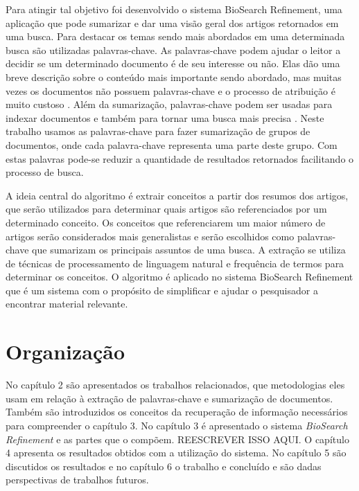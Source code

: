 Para atingir tal objetivo foi desenvolvido o sistema BioSearch Refinement, uma aplicação que pode sumarizar e dar uma visão geral dos artigos retornados em uma busca. Para destacar os temas sendo mais abordados em uma determinada busca são utilizadas palavras-chave. As palavras-chave podem ajudar o leitor a decidir se um determinado documento é de seu interesse ou não. Elas dão uma breve descrição sobre o conteúdo mais importante sendo abordado, mas muitas vezes os documentos não possuem palavras-chave e o processo de atribuição é muito custoso \cite{Lui2007}. Além da sumarização, palavras-chave podem ser usadas para indexar documentos e também para tornar uma busca mais precisa \cite{Turney1999}. Neste trabalho usamos as palavras-chave para fazer sumarização de grupos de documentos, onde cada palavra-chave representa uma parte deste grupo. Com estas palavras pode-se reduzir a quantidade de resultados retornados facilitando o processo de busca.

A ideia central do algoritmo é extrair  conceitos a partir dos resumos dos artigos, que serão utilizados para determinar quais artigos são referenciados por um determinado conceito. Os conceitos que referenciarem um maior número de artigos serão considerados mais generalistas e serão escolhidos como palavras-chave que sumarizam os principais assuntos de uma busca. A extração se utiliza de técnicas de processamento de linguagem natural e frequência de termos para determinar os conceitos. O algoritmo é aplicado no sistema BioSearch Refinement que é um sistema com o propósito de simplificar e ajudar o pesquisador a encontrar material relevante.

\section{Organização}
No capítulo 2 são apresentados os trabalhos relacionados, que metodologias eles usam em relação à extração de palavras-chave e sumarização de documentos. Também são introduzidos os conceitos da recuperação de informação necessários para compreender o capítulo 3. No capítulo 3 é apresentado o sistema \emph{BioSearch Refinement} e as partes que o compõem. 
REESCREVER ISSO AQUI.
O capítulo 4  apresenta os resultados obtidos com a utilização do sistema. No capítulo 5 são discutidos os resultados e no capítulo 6 o trabalho e concluído e são dadas perspectivas de trabalhos futuros.

